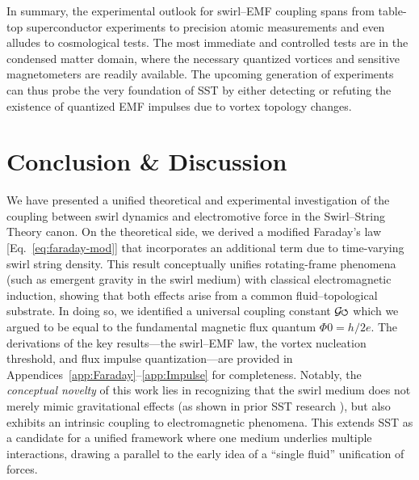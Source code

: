 \documentclass[12pt]{article}
\DeclareRobustCommand{\swirlarrow}{
\mathchoice{\mkern-2mu\scriptstyle\boldsymbol{\circlearrowleft}}%
{\mkern-2mu\scriptstyle\boldsymbol{\circlearrowleft}}%
{\mkern-2mu\scriptscriptstyle\boldsymbol{\circlearrowleft}}%
{\mkern-2mu\scriptscriptstyle\boldsymbol{\circlearrowleft}}
}%
\newcommand{\Gswirl}{\mathcal{G}\swirlarrow}
\begin{document}
In summary, the experimental outlook for swirl–EMF coupling spans from table-top superconductor experiments to precision atomic measurements and even alludes to cosmological tests. The most immediate and controlled tests are in the condensed matter domain, where the necessary quantized vortices and sensitive magnetometers are readily available. The upcoming generation of experiments can thus probe the very foundation of SST by either detecting or refuting the existence of quantized EMF impulses due to vortex topology changes.


\section{Conclusion & Discussion}\label{sec:conclusion}

We have presented a unified theoretical and experimental investigation of the coupling between swirl dynamics and electromotive force in the Swirl--String Theory canon. On the theoretical side, we derived a modified Faraday's law [Eq.~\eqref{eq:faraday-mod}] that incorporates an additional term due to time-varying swirl string density. This result conceptually unifies rotating-frame phenomena (such as emergent gravity in the swirl medium) with classical electromagnetic induction, showing that both effects arise from a common fluid–topological substrate. In doing so, we identified a universal coupling constant $\Gswirl$ which we argued to be equal to the fundamental magnetic flux quantum $\Phi{0}=h/2e$. The derivations of the key results—the swirl–EMF law, the vortex nucleation threshold, and flux impulse quantization—are provided in Appendices~\ref{app:Faraday}--\ref{app:Impulse} for completeness. Notably, the \emph{conceptual novelty} of this work lies in recognizing that the swirl medium does not merely mimic gravitational effects (as shown in prior SST research \cite{Iskandarani2025RotatingFrame}), but also exhibits an intrinsic coupling to electromagnetic phenomena. This extends SST as a candidate for a unified framework where one medium underlies multiple interactions, drawing a parallel to the early idea of a ``single fluid'' unification of forces.
\end{document}
